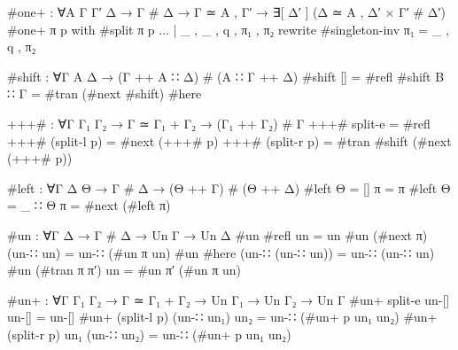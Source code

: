 \begin{code}
#one+ : ∀{A Γ Γ′ Δ} → Γ # Δ → Γ ≃ A , Γ′ → ∃[ Δ′ ] (Δ ≃ A , Δ′ × Γ′ # Δ′)
#one+ π p with #split π p
... | _ , _ , q , π₁ , π₂ rewrite #singleton-inv π₁ = _ , q , π₂

#shift : ∀{Γ A Δ} → (Γ ++ A ∷ Δ) # (A ∷ Γ ++ Δ)
#shift {[]} = #refl
#shift {B ∷ Γ} = #tran (#next #shift) #here

+++# : ∀{Γ Γ₁ Γ₂} → Γ ≃ Γ₁ + Γ₂ → (Γ₁ ++ Γ₂) # Γ
+++# split-e = #refl
+++# (split-l p) = #next (+++# p)
+++# (split-r p) = #tran #shift (#next (+++# p))

#left : ∀{Γ Δ Θ} → Γ # Δ → (Θ ++ Γ) # (Θ ++ Δ)
#left {Θ = []} π = π
#left {Θ = _ ∷ Θ} π = #next (#left π)

#un : ∀{Γ Δ} → Γ # Δ → Un Γ → Un Δ
#un #refl un = un
#un (#next π) (un-∷ un) = un-∷ (#un π un)
#un #here (un-∷ (un-∷ un)) = un-∷ (un-∷ un)
#un (#tran π π′) un = #un π′ (#un π un)

#un+ : ∀{Γ Γ₁ Γ₂} → Γ ≃ Γ₁ + Γ₂ → Un Γ₁ → Un Γ₂ → Un Γ
#un+ split-e un-[] un-[] = un-[]
#un+ (split-l p) (un-∷ un₁) un₂ = un-∷ (#un+ p un₁ un₂)
#un+ (split-r p) un₁ (un-∷ un₂) = un-∷ (#un+ p un₁ un₂)
\end{code}
